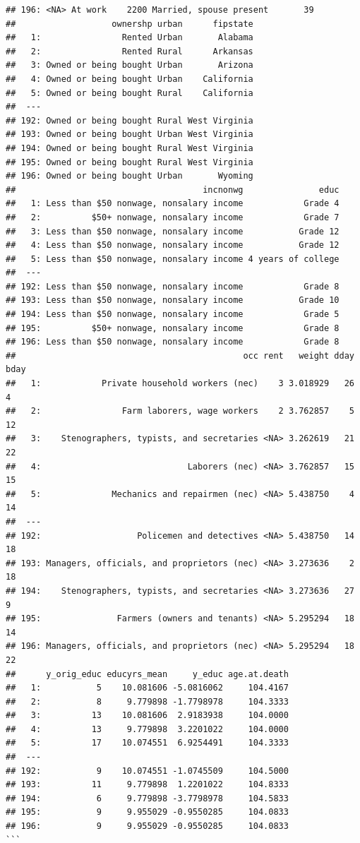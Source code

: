 \documentclass[]{book}
\begin{document}
\begin{verbatim}
## 196: <NA> At work    2200 Married, spouse present       39
##                   ownershp urban      fipstate
##   1:                Rented Urban       Alabama
##   2:                Rented Rural      Arkansas
##   3: Owned or being bought Urban       Arizona
##   4: Owned or being bought Urban    California
##   5: Owned or being bought Rural    California
##  ---                                          
## 192: Owned or being bought Rural West Virginia
## 193: Owned or being bought Urban West Virginia
## 194: Owned or being bought Rural West Virginia
## 195: Owned or being bought Rural West Virginia
## 196: Owned or being bought Urban       Wyoming
##                                     incnonwg               educ
##   1: Less than $50 nonwage, nonsalary income            Grade 4
##   2:          $50+ nonwage, nonsalary income            Grade 7
##   3: Less than $50 nonwage, nonsalary income           Grade 12
##   4: Less than $50 nonwage, nonsalary income           Grade 12
##   5: Less than $50 nonwage, nonsalary income 4 years of college
##  ---                                                           
## 192: Less than $50 nonwage, nonsalary income            Grade 8
## 193: Less than $50 nonwage, nonsalary income           Grade 10
## 194: Less than $50 nonwage, nonsalary income            Grade 5
## 195:          $50+ nonwage, nonsalary income            Grade 8
## 196: Less than $50 nonwage, nonsalary income            Grade 8
##                                             occ rent   weight dday bday
##   1:            Private household workers (nec)    3 3.018929   26    4
##   2:                Farm laborers, wage workers    2 3.762857    5   12
##   3:    Stenographers, typists, and secretaries <NA> 3.262619   21   22
##   4:                             Laborers (nec) <NA> 3.762857   15   15
##   5:              Mechanics and repairmen (nec) <NA> 5.438750    4   14
##  ---                                                                   
## 192:                   Policemen and detectives <NA> 5.438750   14   18
## 193: Managers, officials, and proprietors (nec) <NA> 3.273636    2   18
## 194:    Stenographers, typists, and secretaries <NA> 3.273636   27    9
## 195:               Farmers (owners and tenants) <NA> 5.295294   18   14
## 196: Managers, officials, and proprietors (nec) <NA> 5.295294   18   22
##      y_orig_educ educyrs_mean     y_educ age.at.death
##   1:           5    10.081606 -5.0816062     104.4167
##   2:           8     9.779898 -1.7798978     104.3333
##   3:          13    10.081606  2.9183938     104.0000
##   4:          13     9.779898  3.2201022     104.0000
##   5:          17    10.074551  6.9254491     104.3333
##  ---                                                 
## 192:           9    10.074551 -1.0745509     104.5000
## 193:          11     9.779898  1.2201022     104.8333
## 194:           6     9.779898 -3.7798978     104.5833
## 195:           9     9.955029 -0.9550285     104.0833
## 196:           9     9.955029 -0.9550285     104.0833
```


\end{verbatim}
\end{document}
